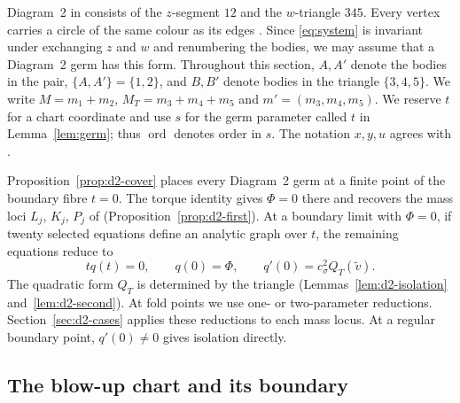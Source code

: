\documentclass[Threeside,11pt]{article}
\theoremstyle{definition}
\theoremstyle{remark}
\numberwithin{equation}{section}
\theoremstyle{remark}
\newcommand{\ord}{\operatorname{ord}}
\begin{document}
{Diagram~2 in \cite[Fig.~11]{AK} consists of the $z$-segment $12$ and the $w$-triangle $345$.
Every vertex carries a circle of the same colour as its edges \cite[\S8.2, p.~572]{AK}.
Since \eqref{eq:system} is invariant under exchanging $z$ and $w$ and renumbering the bodies,
we may assume that a Diagram~2 germ has this form.
Throughout this section, $A,A'$ denote the bodies in the pair, $\{A,A'\}=\{1,2\}$, and $B,B'$
denote bodies in the triangle $\{3,4,5\}$.  We write $M=m_1+m_2$, $M_T=m_3+m_4+m_5$ and
$m'=(m_3,m_4,m_5)$.  We reserve $t$ for a chart coordinate and use $s$ for the germ parameter
called $t$ in Lemma~\ref{lem:germ}; thus $\ord$ denotes order in $s$.
The notation $x,y,u$ agrees with \cite[\S8.2]{AK}.}

{Proposition~\ref{prop:d2-cover} places every Diagram~2 germ at a finite point of the
boundary fibre $t=0$. The torque identity gives $\Phi=0$ there and recovers the
mass loci $L_j$, $K_j$, $P_j$ of \cite[\S8.2]{AK}
(Proposition~\ref{prop:d2-first}). At a boundary limit with $\Phi=0$, if twenty
selected equations define an analytic graph over $t$, the remaining equations reduce to
\[
 tq(t)=0,\qquad q(0)=\Phi,\qquad q'(0)=c_\sigma^2Q_T(\tilde v).
\]
The quadratic form $Q_T$ is determined by the triangle
(Lemmas~\ref{lem:d2-isolation} and~\ref{lem:d2-second}). At fold points we use
one- or two-parameter reductions. Section~\ref{sec:d2-cases} applies these reductions
to each mass locus. At a regular boundary point, $q'(0)\ne0$ gives isolation directly.}

\subsection{\texorpdfstring{The blow-up chart and its boundary}{The blow-up chart and its boundary}}\label{sec:d2-chart}
\end{document}
